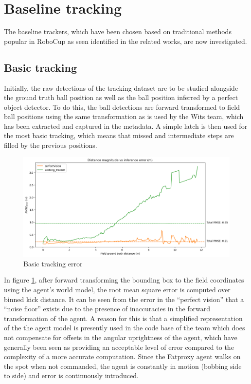 \documentclass[a4paper,twoside,12pt]{report}
\begin{document}
\section{Baseline tracking}

The baseline trackers, which have been chosen based on traditional methods popular in RoboCup as seen identified in the related works, are now investigated.

\subsection{Basic tracking}

Initially, the raw detections of the tracking dataset are to be studied alongside the ground truth ball position as well as the ball position inferred by a perfect object detector. To do this, the ball detections are forward transformed to field ball positions using the same transformation as is used by the Wits team, which has been extracted and captured in the metadata. A simple latch is then used for the most basic tracking, which means that missed and intermediate steps are filled by the previous positions.

\begin{figure}[h!]
\begin{center}
\includegraphics[width=14cm]{images/raw_error.png}
\caption{Basic tracking error}
\label{fig:rawerror}
\end{center}
\end{figure}

In figure \ref{fig:rawerror}, after forward transforming the bounding box to the field coordinates using the agent's world model, the root mean square error is computed over binned kick distance. It can be seen from the error in the ``perfect vision'' that a ``noise floor'' exists due to the presence of inaccuracies in the forward transformation of the agent. A reason for this is that a simplified representation of the the agent model is presently used in the code base of the team which does not compensate for offsets in the angular uprightness of the agent, which have generally been seen as providing an acceptable level of error compared to the complexity of a more accurate computation. Since the Fatproxy agent walks on the spot when not commanded, the agent is constantly in motion (bobbing side to side) and error is continuously introduced.
\end{document}
